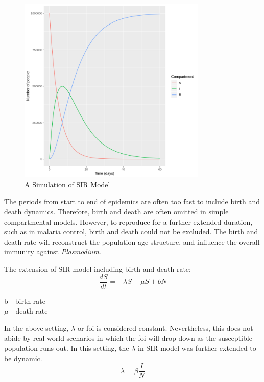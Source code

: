 \documentclass[a4paper, 12pt, twoside]{report}
\begin{document}
\begin{figure}[htpb]
	\centering
	\includegraphics[width=0.8\textwidth]{sir-model}
	\caption{A Simulation of SIR Model}
	\label{fig:sir-model}
\end{figure}

The periods from start to end of epidemics are often too fast to include birth and death dynamics.
Therefore, birth and death are often omitted in simple compartmental models.
However, to reproduce for a further extended duration, such as in malaria control, birth and death could not be excluded.
The birth and death rate will reconstruct the population age structure, and influence the overall immunity against \textit{Plasmodium}.

The extension of SIR model including birth and death rate:
\begin{equation}
  \frac{dS}{dt}=-\lambda S-\mu S+bN
\end{equation} 
\begin{center}
  b - birth rate \\
  $\mu$ - death rate \\
\end{center}  

In the above setting, $\lambda$ or  \gls{foi} is considered constant.
Nevertheless, this does not abide by real-world scenarios in which the \gls{foi} will drop down as the susceptible population runs out.
In this setting, the $\lambda$ in SIR model was further extended to be dynamic.
\begin{equation}
	\lambda = \beta \frac{I}{N}
\end{equation}
\end{document}
